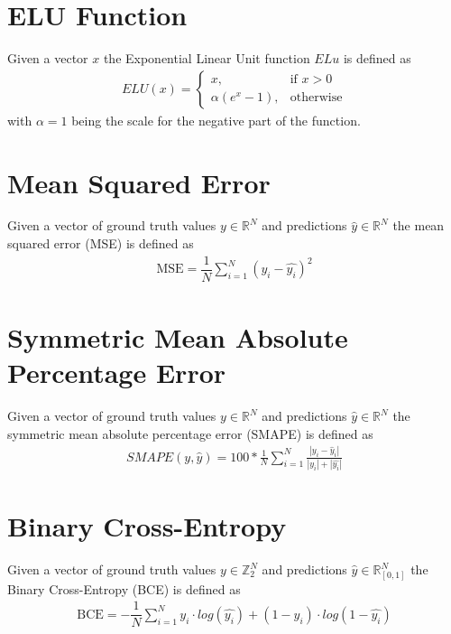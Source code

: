 \section{ELU Function}
Given a vector $x$ the Exponential Linear Unit function $ELu$ is defined as 
\begin{gather}
    \label{elu}
    ELU(x) = 
    \begin{cases}
        x,& \text{if } x > 0 \\
        \alpha (e^{x} -1),              & \text{otherwise}
    \end{cases}
\end{gather}
with $\alpha=1$ being the scale for the negative part of the function.

\section{Mean Squared Error}
Given a vector of ground truth values $y \in \mathbb{R}^N$ and predictions $\widehat{y} \in \mathbb{R}^N$ the mean squared error (MSE) is defined as 
\begin{gather}
\label{mse}
    \text{MSE}=
        \dfrac
            {1}
            {N}
            \sum\limits_{i=1}^{N}  (y_i - \hat{y_i})^2
\end{gather}

\section{Symmetric Mean Absolute Percentage Error}
Given a vector of ground truth values $y \in \mathbb{R}^N$ and predictions $\widehat{y} \in \mathbb{R}^N$ the symmetric mean absolute percentage error (SMAPE) is defined as 
\begin{equation}
  \begin{gathered} 
  \label{smape}
     SMAPE(y, \widehat{y}) = 100 *
    \frac{1}{N} 
    \sum_{i=1}^{N}
    \frac{| y_{i} - \widehat{y}_{i} |} {|y_{i}| + |\widehat{y_{i}}|}  
  \end{gathered}
\end{equation}

\section{Binary Cross-Entropy}
Given a vector of ground truth values $y \in \mathbb{Z}_2^N$ and predictions $\widehat{y} \in \mathbb{R}^N_{[0, 1]}$ the Binary Cross-Entropy (BCE)  is defined as 
\begin{gather}
\label{bce}
    \text{BCE}=
        -\dfrac
            {1}
            {N}
        \sum\limits_{i=1}^{N}  y_i \cdot log(\hat{y_i}) + (1-y_i) \cdot log(1 - \hat{y_i})
\end{gather}

